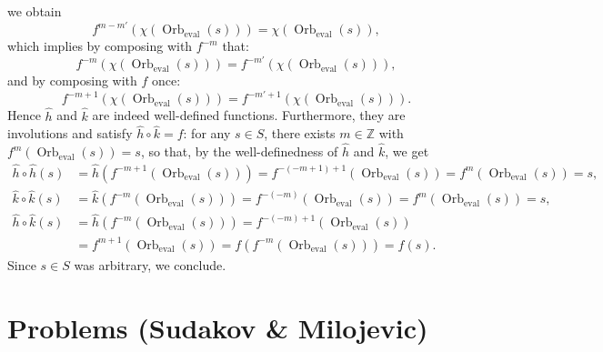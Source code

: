 \documentclass[11pt, a4paper, oneside]{article}
\newcommand{\problem}[1][]{\section{#1} \hfill \par}
\theoremstyle{remark}
\theoremstyle{lemma}
\begin{document}
we obtain
\[
f^{m - m'}\left( \chi\left( \operatorname{Orb}_{\operatorname{eval}}(s) \right) \right) = \chi\left( \operatorname{Orb}_{\operatorname{eval}}(s) \right),
\]
which implies by composing with \(f^{-m}\) that:
\[
f^{-m}\left( \chi\left( \operatorname{Orb}_{\operatorname{eval}}(s) \right) \right) = f^{-m'}\left( \chi\left( \operatorname{Orb}_{\operatorname{eval}}(s) \right) \right),
\]
and by composing with \( f \) once:
\[
f^{-m + 1}\left( \chi\left( \operatorname{Orb}_{\operatorname{eval}}(s) \right) \right) = f^{-m' + 1}\left( \chi\left( \operatorname{Orb}_{\operatorname{eval}}(s) \right) \right). 
\]
Hence \( \hat{h} \) and \( \hat{k} \) are indeed well-defined functions. Furthermore, they are involutions and satisfy \( \hat{h} \circ \hat{k} = f \): for any \( s \in S \), there exists \( m \in \mathbb{Z} \) with \( f^{m}\left( \operatorname{Orb}_{\operatorname{eval}}(s) \right) = s \), so that, by the well-definedness of \( \hat{h} \) and \( \hat{k} \), we get
\begin{align*}
\hat{h} \circ \hat{h}(s) &= \hat{h}\left( f^{-m+1}\left( \operatorname{Orb}_{\operatorname{eval}}(s) \right) \right) = f^{-(-m+1)+1}\left( \operatorname{Orb}_{\operatorname{eval}}(s) \right) = f^{m}\left( \operatorname{Orb}_{\operatorname{eval}}(s) \right) = s,
\\
\hat{k} \circ \hat{k}(s) &= \hat{k}\left( f^{-m}\left( \operatorname{Orb}_{\operatorname{eval}}(s) \right) \right) = f^{-(-m)}\left( \operatorname{Orb}_{\operatorname{eval}}(s) \right) = f^{m}\left( \operatorname{Orb}_{\operatorname{eval}}(s) \right) = s,
\\
\hat{h} \circ \hat{k}(s) &= \hat{h}\left( f^{-m}\left( \operatorname{Orb}_{\operatorname{eval}}(s) \right) \right) = f^{-(-m)+1}\left( \operatorname{Orb}_{\operatorname{eval}}(s) \right)
\\
&= f^{m+1}\left( \operatorname{Orb}_{\operatorname{eval}}(s) \right) = f\left( f^{-m}\left( \operatorname{Orb}_{\operatorname{eval}}(s) \right) \right) = f(s).
\end{align*}
Since \( s \in S \) was arbitrary, we conclude.


\newpage
\problem[Problems (Sudakov \& Milojevic)]
\end{document}
